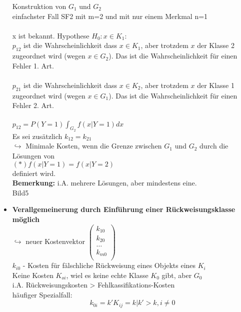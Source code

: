 \documentclass[a4paper,12pt]{scrreprt}
\newcommand{\Nb}[1]{\textbf{#1}}
\newcommand{\itemd}[1]{\item{\textbf{#1}} }
\begin{document}
\begin{itemize}
		Konstruktion von $G_1$ und $G_2$\\
		einfachster Fall SF2 mit m=2 und mit nur einem Merkmal n=1\\
		\\
		x ist bekannt. Hypothese $H_0: x\in K_1$:\\
		$p_{12}$ ist die Wahrscheinlichkeit dass $x\in K_1$, aber
		trotzdem $x$ der Klasse 2 zugeordnet wird (wegen $x\in G_2$).
		Das ist die Wahrscheinlichkeit für einen Fehler 1. Art.\\
		\\
		$p_{21}$ ist die Wahrscheinlichkeit dass $x\in K_2$, aber
		trotzdem $x$ der Klasse 1 zugeordnet wird (wegen $x\in G_1$).
		Das ist die Wahrscheinlichkeit für einen Fehler 2. Art.\\
		\\
		$p_{12} = P(Y=1) \int_{G_2} f(x| Y = 1 ) dx $\\
		Es sei zusätzlich $k_{12} = k_{21}$\\
		$ \hookrightarrow $ Minimale Kosten, wenn die Grenze zwischen $G_1$ und $ G_2$ durch die Lösungen von \\
		$(*) f(x|Y=1) = f (x| Y=2)$\\
		definiert wird.\\
		\Nb{Bemerkung:} i.A. mehrere Lösungen, aber mindestens eine.\\
		
		Bild5
	
	\itemd{Verallgemeinerung durch Einführung einer Rückweisungsklasse möglich}\\
	$\hookrightarrow$ neuer Kostenvektor $(\begin{array}{ l}
	                                       k_{10}\\
	                                       k_{20}\\
	                                       \dots\\
	                                       k_{m0}\\
	                                     \end{array})$ \\
	$k_{i0}$ - Kosten für fälschliche Rückweisung eines Objekts eines $K_i$\\
	Keine Kosten $K_{oi}$, wiel es keine echte Klasse $K_0$ gibt, aber $G_0$\\
	i.A. Rückweisungskosten > Fehlkassifikations-Kosten\\
	häufiger Spezialfall:\\
	$$ k_{0i} = k' K_{ij} = k | k' > k , i \neq 0 $$
	

\end{itemize}
\end{document}
